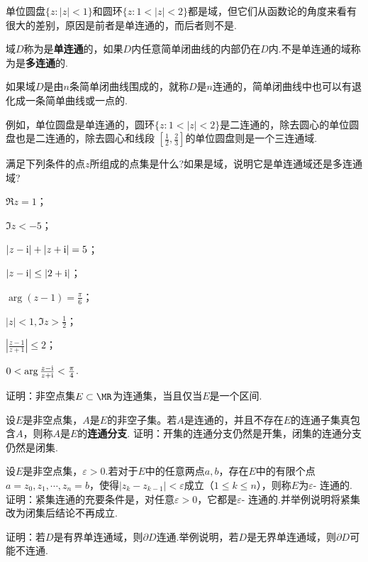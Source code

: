 单位圆盘$\{z:|z|<1\}$和圆环$\{z:1<|z|<2\}$都是域，但它们从函数论的角度来看有很大的差别，原因是前者是单连通的，而后者则不是.
\begin{definition}
域$D$称为是\textbf{单连通}的，如果$D$内任意简单闭曲线的内部仍在$D$内.不是单连通的域称为是\textbf{多连通}的.
\end{definition}
\begin{definition}
如果域$D$是由$n$条简单闭曲线围成的，就称$D$是$n$连通的，简单闭曲线中也可以有退化成一条简单曲线或一点的.
\end{definition}

例如，单位圆盘是单连通的，圆环$\{z:1<|z|<2\}$是二连通的，除去圆心的单位圆盘也是二连通的，除去圆心和线段
$\left[\frac12,\frac23\right]$的单位圆盘则是一个三连通域.
\begin{xiti}\hypertarget{xiti1.6}{}
\item 满足下列条件的点$z$所组成的点集是什么?如果是域，说明它是单连通域还是多连通域?
\begin{enuma}
  \item $\Re z=1$；
  \item $\Im z<-5$；
  \item $|z-\textrm  i|+|z+\textrm  i|=5$；
  \item $|z-\textrm  i|\le|2+\textrm  i|$；
  \item $\arg(z-1)=\frac\pi6$；
  \item $|z|<1,\Im z>\frac12$；
  \item $\left|\frac{z-1}{z+1}\right|\le2$；
  \item $0<\arg\frac{z-\textrm  i}{z+\textrm  i}<\frac\pi4$.
\end{enuma}
\item \hypertarget{xiti1.6.2}{}证明：非空点集$E\subset \MR$为连通集，当且仅当$E$是一个区间.
\item 设$E$是非空点集，$A$是$E$的非空子集。若$A$是连通的，并且不存在$E$的连通子集真包含$A$，则称$A$是$E$的\textbf{连通分支}. 证明：开集的连通分支仍然是开集，闭集的连通分支仍然是闭集.
\item 设$E$是非空点集，$\varepsilon>0$.若对于$E$中的任意两点$a,b$，存在$E$中的有限个点$a=z_0,z_1,\cdots,z_n=b$，使得$|z_k-z_{k-1}|<\varepsilon$成立（$1\le k\le n$），则称$E$为$\varepsilon$- 连通的. 证明：紧集连通的充要条件是，对任意$\varepsilon>0$，它都是$ \varepsilon$- 连通的.并举例说明将紧集改为闭集后结论不再成立.
\item 证明：若$D$是有界单连通域，则$\partial D$连通.举例说明，若$D$是无界单连通域，则$\partial D$可能不连通.
\end{xiti}

